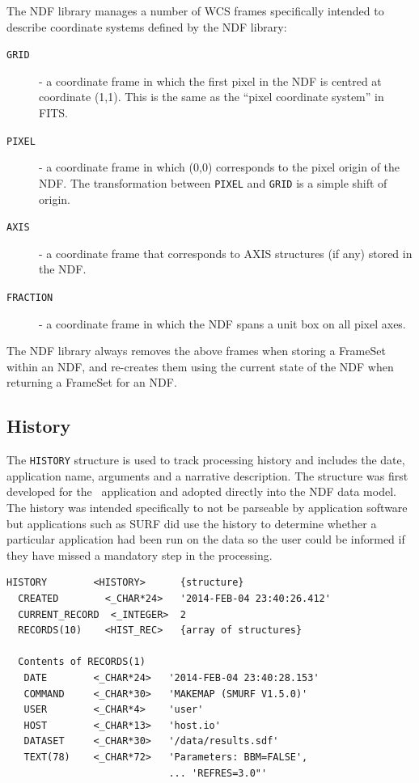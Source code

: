 \documentclass[final,authoryear,5p,times,twocolumn]{elsarticle}
\begin{document}
The NDF library manages a number of WCS frames specifically intended to
describe coordinate systems defined by the NDF library:

\begin{description}
\item[\texttt{GRID}] - a coordinate frame in which the first pixel in the NDF is
centred at coordinate (1,1). This is the same as the ``pixel coordinate
system'' in FITS.
\item[\texttt{PIXEL}] - a coordinate frame in which (0,0) corresponds to
the pixel origin of the NDF. The transformation between \texttt{PIXEL}
and \texttt{GRID} is a simple shift of origin.
\item[\texttt{AXIS}] - a coordinate frame that corresponds to AXIS
structures (if any) stored in the NDF.
\item[\texttt{FRACTION}] - a coordinate frame in which the NDF spans a
unit box on all pixel axes.
\end{description}

The NDF library always removes the above frames when storing a FrameSet
within an NDF, and re-creates them using the current state of the NDF
when returning a FrameSet for an NDF.

\subsection{History}

The \texttt{HISTORY} structure is used to track processing history and
includes the date, application name, arguments and a narrative
description. The structure was first developed for the
\asterix\ application and adopted directly into the NDF data
model. The history was intended specifically to not be parseable by
application software but applications such as SURF
\citep{1998ASPC..145..216J} did use the history to determine whether a
particular application had been run on the data so the user could be
informed if they have missed a mandatory step in the processing.

{\small
\begin{verbatim}
HISTORY        <HISTORY>      {structure}
  CREATED        <_CHAR*24>   '2014-FEB-04 23:40:26.412'
  CURRENT_RECORD  <_INTEGER>  2
  RECORDS(10)    <HIST_REC>   {array of structures}

  Contents of RECORDS(1)
   DATE        <_CHAR*24>   '2014-FEB-04 23:40:28.153'
   COMMAND     <_CHAR*30>   'MAKEMAP (SMURF V1.5.0)'
   USER        <_CHAR*4>    'user'
   HOST        <_CHAR*13>   'host.io'
   DATASET     <_CHAR*30>   '/data/results.sdf'
   TEXT(78)    <_CHAR*72>   'Parameters: BBM=FALSE',
                            ... 'REFRES=3.0"'
\end{verbatim}
}
\end{document}

